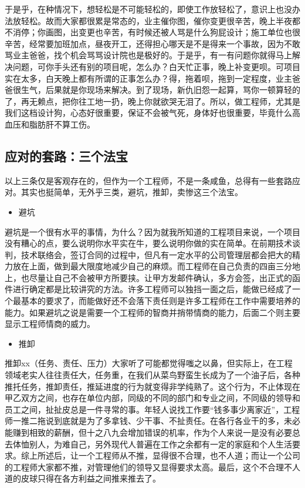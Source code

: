 \documentclass[
]{book}
\providecommand{\tightlist}{%
  \setlength{\itemsep}{0pt}\setlength{\parskip}{0pt}}
\begin{document}
于是乎，在种情况下，想轻松是不可能轻松的，即使工作放轻松了，意识上也没办法放轻松。故而大家都很累是常态的，业主催你图，催你变更很辛苦，晚上半夜都不消停；你画图，出变更也辛苦，有时候还被人骂是什么狗屁设计；施工单位也很辛苦，经常要加班加点，昼夜开工，还得担心哪天是不是得来一个事故，因为不敢骂业主爸爸，找个机会骂骂设计院也是极好的。于是乎，有一有问题你就得马上解决问题，可你手头还有别的项目呢，怎么办？白天忙正事，晚上补变更呗。可项目实在太多，白天晚上都有所谓的正事怎么办？得，拖着呗，拖到一定程度，业主爸爸很生气，后果就是你现场来解决。到了现场，新仇旧怨一起算，骂你一顿算轻的了，再无赖点，把你往工地一扔，晚上你就欲哭无泪了。所以，做工程师，尤其是我们这档设计狗，心态好很重要，保证不会被气死，身体好也很重要，毕竟什么高血压和脂肪肝不算工伤。

\hypertarget{ux5e94ux5bf9ux7684ux5957ux8defux4e09ux4e2aux6cd5ux5b9d}{%
\subsection{应对的套路：三个法宝}\label{ux5e94ux5bf9ux7684ux5957ux8defux4e09ux4e2aux6cd5ux5b9d}}

以上三条仅是客观存在的，但作为一个工程师，不是一条咸鱼，总得有一些套路应对。其实也挺简单，无外乎三类，避坑，推卸，卖惨这三个法宝。

\begin{itemize}
\tightlist
\item
  避坑
\end{itemize}

避坑是一个很有水平的事情，为什么？因为就我所知道的工程项目来说，一个项目没有糟心的点，要么说明你水平实在牛，要么说明你做的实在简单。在前期技术谈判，技术联络会，签订合同的过程中，但凡有一定水平的公司管理层都会把大的精力放在上面，做到最大限度地减少自己的麻烦。而工程师在自己负责的四亩三分地上，也尽量让自己不会被甲方所要挟。让甲方发邮件确认，多方会签，出正式的函件进行确定都是比较讲究的方法。许多工程师可以独挡一面之后，能做已经成了一个最基本的要求了，而能做好还不会落下责任则是许多工程师在工作中需要培养的能力。如果避坑之说是需要一个工程师的智商并捎带情商的能力，后面二个则主要显示工程师情商的威力。

\begin{itemize}
\tightlist
\item
  推卸
\end{itemize}

推卸xx（任务、责任、压力）大家听了可能都觉得嗤之以鼻，但实际上，在工程领域老实人往往责任大，任务重，在我们从菜鸟野蛮生长成为了一个油子后，各种推托任务，推卸责任，推延进度的行为就变得非学纯熟了。这个行为，不止体现在甲乙双方之间，也存在单位内部，同级的不同的部门和专业之间，不同级的领导和员工之间，扯扯皮总是一件寻常的事。年轻人说找工作要``钱多事少离家近''，工程师一推二拖说到底就是为了多拿钱、少干事、不扯责任。在各行各业干的多，未必能赚到相致的薪酬，但十之八九会增加错误的机率，作为个人来说一是没有必要总去体恤别人，为难自己，另外现代人普遍在工作之余都有一定的家庭和个人生活要求。综上所述后，让一个工程师从不推，显得很不合理，也不人道；而让一个公司的工程师大家都不推，对管理他们的领导又显得要求太高。最后，这个不合理不人道的皮球只得在各方利益之间推来推去了。
\end{document}
